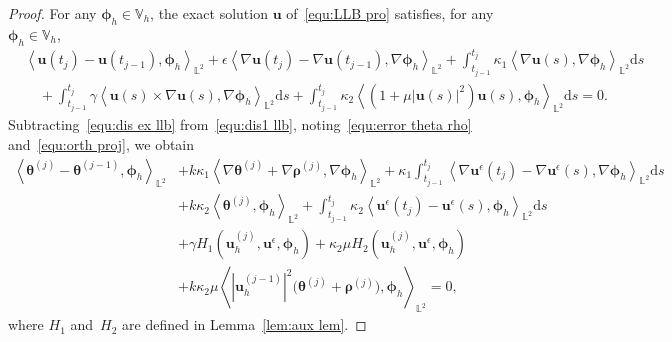 \documentclass[11pt,reqno]{amsart}
\theoremstyle{definition}
\numberwithin{equation}{section}
\newcommand{\bff}{\boldsymbol}
\newcommand{\bb}{\mathbb}
\newcommand{\ds}{\mathrm{d}s}
\newcommand{\nn}{\nonumber}
\newcommand{\inpro}[2]{\left\langle#1,#2\right\rangle}
\begin{document}
\begin{proof}
	For any $ \bff{\phi}_h\in\bb{V}_h$, the exact solution $\bff{u}$ of~\eqref{equ:LLB pro} satisfies, for any~$\bff{\phi}_h\in\bb{V}_h$,
	\begin{align}\label{equ:dis ex llb}
		&\inpro{\bff{u}(t_j)-\bff{u}(t_{j-1})}{\bff{\phi}_h}_{\bb{L}^2}
		+
		\epsilon\inpro{\nabla\bff{u}(t_j)-\nabla\bff{u}(t_{j-1})}{\nabla\bff{\phi}_h}_{\bb{L}^2}
		+
		\int_{t_{j-1}}^{t_j} \kappa_1 \inpro{\nabla\bff{u}(s)}{\nabla\bff{\phi}_h}_{\bb{L}^2}\ds
		\nn\\
		&\quad
		+
		\int_{t_{j-1}}^{t_j}
		\gamma \inpro{\bff{u}(s)\times\nabla\bff{u}(s)}{\nabla\bff{\phi}_h}_{\bb{L}^2}\ds
		+
		\int_{t_{j-1}}^{t_j}
		\kappa_2 \inpro{(1+\mu |\bff{u}(s)|^2)\bff{u}(s)}{\bff{\phi}_h}_{\bb{L}^2} \ds
		=0.
	\end{align}
	Subtracting~\eqref{equ:dis ex llb} from~\eqref{equ:dis1 llb}, noting~\eqref{equ:error theta rho} and~\eqref{equ:orth proj}, we obtain
	\begin{align}\label{equ:theta llb}
		\inpro{\bff{\theta}^{(j)}-\bff{\theta}^{(j-1)}}{\bff{\phi}_h}_{\bb{L}^2}
		&+
		k\kappa_1 \inpro{\nabla\bff{\theta}^{(j)}+\nabla \bff{\rho}^{(j)}}{\nabla\bff{\phi}_h}_{\bb{L}^2}
		+
		\kappa_1
		\int_{t_{j-1}}^{t_j} 
		\inpro{\nabla\bff{u}^\epsilon(t_j)- \nabla \bff{u}^\epsilon(s)}{\nabla\bff{\phi}_h}_{\bb{L}^2} \ds
		\nn\\
		&
		+ k \kappa_2 \inpro{\bff{\theta}^{(j)}}{\bff{\phi}_h}_{\bb{L}^2}
		+
		\int_{t_{j-1}}^{t_j} \kappa_2 \inpro{\bff{u}^\epsilon(t_j)- \bff{u}^\epsilon(s)}{\bff{\phi}_h}_{\bb{L}^2} \ds 
		\nn\\
		&+
		\gamma H_1(\bff{u}_h^{(j)},\bff{u}^\epsilon,\bff{\phi}_h) 
		+ 
		\kappa_2 \mu
		H_2(\bff{u}_h^{(j)},\bff{u}^\epsilon,\bff{\phi}_h) 
		\nn\\
		&
		+
		k \kappa_2 \mu
		\inpro{|\bff{u}_h^{(j-1)}|^2
			\big(\bff{\theta}^{(j)}+\bff{\rho}^{(j)}\big)}{\bff{\phi}_h}_{\bb{L}^2}
		=0,
	\end{align}
	where $H_1$ and~$H_2$ are defined in Lemma~\ref{lem:aux lem}.



\end{proof}
\end{document}
